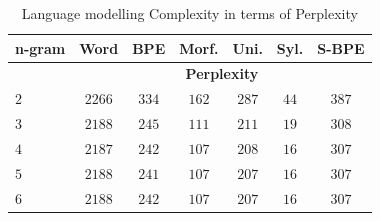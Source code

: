\begin{table}[ht]
    \centering
    \caption{Language modelling Complexity in terms of Perplexity}
    \label{tab:perplexity}
    \begin{tabular}{l|cccccc}
        \hline \hline
        \textbf{n-gram} & \textbf{Word}                            & \textbf{BPE} & \textbf{Morf.} & \textbf{Uni.} & \textbf{Syl.} & \textbf{S-BPE} \\ \hline

        \hline
                       & \multicolumn{6}{c}{\textbf{Perplexity}}                                                                                  \\ \hline

        $2$            & $2266$                                   & $334$        & $162$          & $287$         & $44$          & $387$          \\ $3$   & $2188$ & $245$ &
        $111$          & $211$                                    & $19$         & $308$                                                           \\ $4$ & $2187$ & $242$ & $107$ & $208$ & $16$ & $307$
        \\ $5$ & $2188$ & $241$ & $107$ & $207$ & $16$ & $307$ \\ $6$ & $2188$ & $242$
                       & $107$                                    & $207$        & $16$           & $307$                                          \\ \hline

    \end{tabular}

\end{table}

